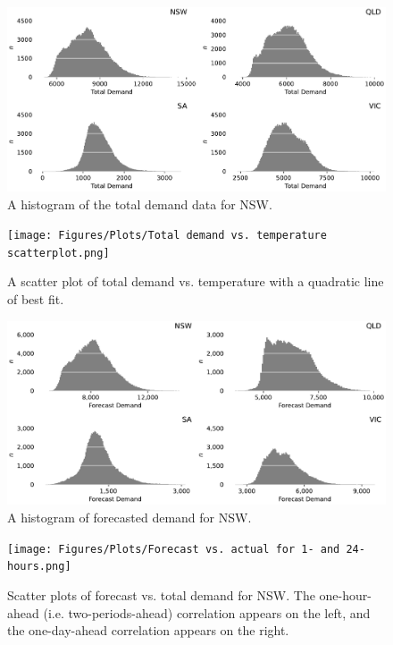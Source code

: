 \documentclass[mstat,12pt]{unswthesis}
\begin{document}
\begin{figure}[H]
\centerline{\includegraphics[width=0.8\columnwidth]{Figures/Plots/Total Demand histogram.pdf}}
\caption{A histogram of the total demand data for NSW.}
\label{tdemand}
\end{figure}

\begin{figure}[H]
\centerline{\texttt{[image: Figures/Plots/Total demand vs. temperature scatterplot.png]}}
\caption{A scatter plot of total demand vs. temperature with a quadratic line of best fit.}
\label{temp_vs_tdemand}
\end{figure}

\begin{figure}[H]
\centerline{\includegraphics[width=0.8\columnwidth]{Figures/Plots/Forecast demand histogram.pdf}}
\caption{A histogram of forecasted demand for NSW.}
\label{fdemand}
\end{figure}

\begin{figure}[H]
\centerline{\texttt{[image: Figures/Plots/Forecast vs. actual for 1- and 24-hours.png]}}
\caption{Scatter plots of forecast vs. total demand for NSW. The one-hour-ahead (i.e. two-periods-ahead) correlation appears on the left, and the one-day-ahead correlation appears on the right.}
\label{fdemand_vs_tdemand}
\end{figure}
\end{document}
